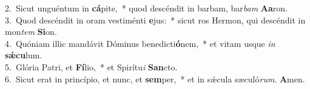 {2.~}Sicut unguéntum in \textbf{cá}pite,~* quod descéndit in barbam, bar\textit{bam} \textbf{A}\textbf{a}ron.\\
{3.~}Quod descéndit in oram vestiménti \textbf{e}jus:~* sicut ros Hermon, qui descéndit in mon\textit{tem} \textbf{Si}on.\\
{4.~}Quóniam illic mandávit Dóminus benedicti\textbf{ó}nem,~* et vitam usque \textit{in} \textbf{sǽ}\textbf{cu}lum.\\
{5.~}Glória Patri, et \textbf{Fí}lio,~* et Spirítu\textit{i} \textbf{San}cto.\\
{6.~}Sicut erat in princípio, et nunc, et \textbf{sem}per,~* et in sǽcula sæculó\textit{rum}. \textbf{A}men.\\
